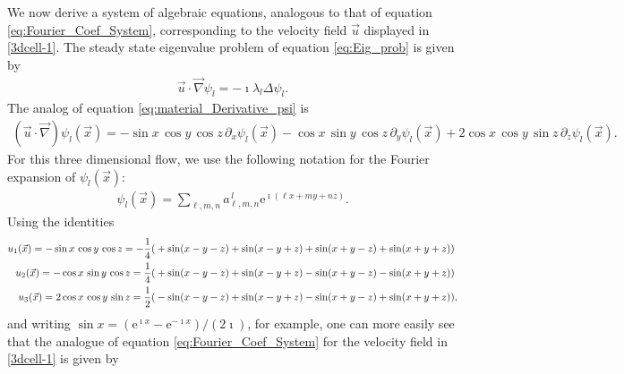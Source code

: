 \documentclass{article}
\newcommand{\e}{\mathrm{e}}
\newcommand{\0}{\mathbf{0}}
\newcommand{\1}{\mathbf{1}}
\newcommand{\2}{\mathbf{2}}
\newcommand{\3}{\mathbf{3}}
\newcommand{\4}{\mathbf{4}}
\newcommand{\5}{\mathbf{5}}
\newcommand{\6}{\mathbf{6}}
\newcommand{\7}{\mathbf{7}}
\newcommand{\8}{\mathbf{8}}
\begin{document}
We now derive a system of algebraic equations, analogous to that of
equation \eqref{eq:Fourier_Coef_System}, corresponding to the velocity
field $\vec{u}$ displayed in \eqref{3dcell-1}. The steady state
eigenvalue problem of equation \eqref{eq:Eig_prob} is given by
%
\begin{align}\label{eq:Steady_Eig_prob}
  \vec{u}\cdot\vec{\nabla}\psi_l=-\imath\lambda_l\Delta\psi_l.
\end{align}
%
The analog of equation \eqref{eq:material_Derivative_psi} is
%
\begin{align}\label{eq:Steady_material_Derivative_psi}
  (\vec{u}\cdot\vec{\nabla})\psi_l(\vec{x})=
         -\sin{x}\,\cos{y}\,\cos{z}\,\partial_x\psi_l(\vec{x})
         -\cos{x}\,\sin{y}\,\cos{z}\,\partial_y\psi_l(\vec{x})
         +2\cos{x}\,\cos{y}\,\sin{z}\,\partial_z\psi_l(\vec{x}).
\end{align}
%
For this three dimensional flow, we use the following notation for the
Fourier expansion of $\psi_l(\vec{x})$:
%
\begin{align}
  \psi_l(\vec{x})=\sum_{\ell,m,n}a^{\,l}_{\ell,m,n}\e^{\imath (\ell x+my+nz)}.
\end{align}
%
Using the identities
%
\begin{align}\label{eq:Velocity_Field_3D}
  u_1(\vec{x})=-\sin{x}\,\cos{y}\,\cos{z}
     =-\frac{1}{4}(&+\sin(x-y-z)+\sin(x-y+z)+\sin(x+y-z)+\sin(x+y+z))
     \notag\\
  u_2(\vec{x})=-\cos{x}\,\sin{y}\,\cos{z}
     =\frac{1}{4}(&+\sin(x-y-z)+\sin(x-y+z)-\sin(x+y-z)-\sin(x+y+z))
     \notag\\
  u_3(\vec{x})=2\cos{x}\,\cos{y}\,\sin{z}
     =\frac{1}{2}(&-\sin(x-y-z)+\sin(x-y+z)-\sin(x+y-z)+\sin(x+y+z)),   
\end{align}
%
and writing $\sin{x}=(\e^{\imath x}-\e^{-\imath x})/(2\imath)$, for example, one can
more easily see that the analogue of equation
\eqref{eq:Fourier_Coef_System} for the velocity field in
\eqref{3dcell-1} is given by 
%
\end{document}
